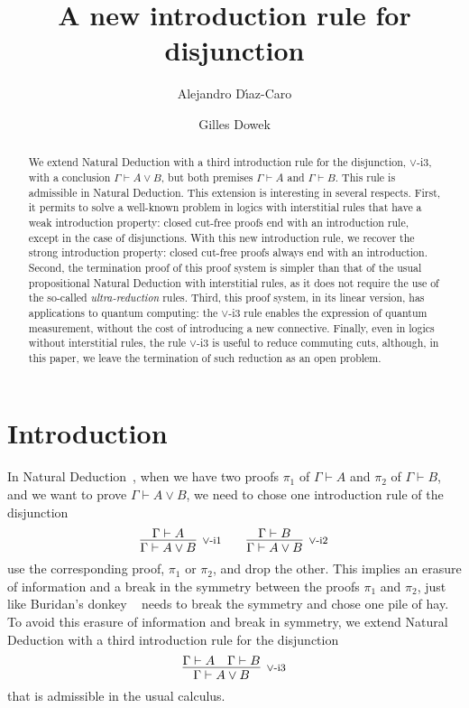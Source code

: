 \documentclass[screen, sigconf,authorversion,nonacm]{acmart}
\title{A new introduction rule for disjunction}
\author{Alejandro D\'{\i}az-Caro}
\affiliation{
  \institution{Université de Lorraine, CNRS, Inria, LORIA}
  \city{Nancy}
  \country{France}
  \and
  \institution{Universidad Nacional de Quilmes}
  \city{Bernal}
  \state{Buenos Aires}
  \country{Argentina}
}
\author{Gilles Dowek}
\affiliation{%
  \institution{Inria and ENS Paris-Saclay}
  \city{Paris}
  \country{France}
}
\theoremstyle{acmdefinition}
\numberwithin{equation}{section}
\newcommand\irule[3]{\infer[\mbox{\footnotesize $#3$}]{#2}{#1}}
\begin{document}
\begin{abstract}
We extend Natural Deduction with a third introduction rule for the
disjunction, $\vee$-i3, with a conclusion $\Gamma \vdash A \vee B$,
but both premises $\Gamma \vdash A$ and $\Gamma \vdash B$.  This rule
is admissible in Natural Deduction.  This extension
is interesting in several respects.  First, it permits to solve a
well-known problem in logics with interstitial rules that have a weak
introduction property: closed cut-free proofs end with an introduction
rule, except in the case of disjunctions.  With this new introduction
rule, we recover the strong introduction property: closed cut-free
proofs always end with an introduction.  Second, the termination proof
of this proof system is simpler than that of the usual propositional
Natural Deduction with interstitial rules, as it does not require the
use of the so-called {\it ultra-reduction} rules.  Third, this proof
system, in its linear version, has applications to quantum computing:
the $\vee$-i3 rule enables the expression of quantum measurement,
without the cost of introducing a new connective.  Finally, even in
logics without interstitial rules, the rule $\vee$-i3 is useful to
reduce commuting cuts, although, in this paper, we leave the
termination of such reduction as an open problem.
\end{abstract}

\maketitle

\section{Introduction}

In Natural Deduction~\cite{Prawitz}, when we have two proofs $\pi_1$ of $\Gamma
\vdash A$ and $\pi_2$ of $\Gamma \vdash B$, and we want to prove
$\Gamma \vdash A \vee B$, we need to chose one introduction rule of
the disjunction
$$\irule{\Gamma \vdash A}
        {\Gamma \vdash A \vee B}
        {\mbox{$\vee$-i1}}
  \qquad
  \irule{\Gamma \vdash B}
        {\Gamma \vdash A \vee B}
        {\mbox{$\vee$-i2}}$$        
use the corresponding proof, $\pi_1$ or $\pi_2$, and drop the
other. This implies an erasure of information and a break in the
symmetry between the proofs $\pi_1$ and $\pi_2$, just like Buridan's
donkey ~\cite{wiki} needs to break the symmetry and chose one pile of
hay.  To avoid this erasure of information and break in symmetry, we
extend Natural Deduction with a third introduction rule for the
disjunction
$$\irule{\Gamma \vdash A & \Gamma \vdash B}
        {\Gamma \vdash A \vee B}
        {\mbox{$\vee$-i3}}$$
that is admissible in the usual calculus.
\end{document}
